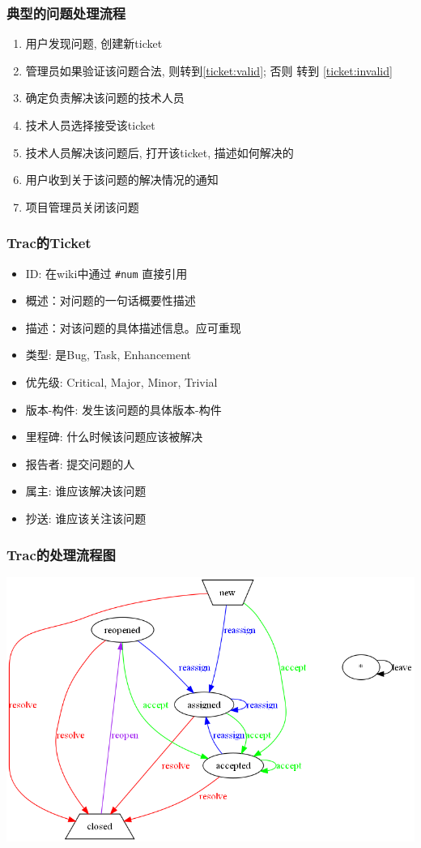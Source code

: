 \documentclass[compress]{beamer}
\begin{document}
\begin{frame}
    \frametitle{典型的问题处理流程}
    \begin{enumerate}
        \item 用户发现问题, 创建新ticket
        \item 管理员如果验证该问题合法,
            则转到\textcircled{\ref{ticket:valid}}; 否则 转到
            \textcircled{\ref{ticket:invalid}}
        \item \label{ticket:valid}确定负责解决该问题的技术人员
        \item 技术人员选择接受该ticket
        \item 技术人员解决该问题后, 打开该ticket, 描述如何解决的
        \item 用户收到关于该问题的解决情况的通知
        \item \label{ticket:invalid}项目管理员关闭该问题
    \end{enumerate}
\end{frame}

\begin{frame}[containsverbatim]
    \frametitle{Trac的Ticket}
    \begin{itemize}
        \item ID: 在wiki中通过 \verb~#num~ 直接引用
        \item 概述：对问题的一句话概要性描述
        \item 描述：对该问题的具体描述信息。应可重现
        \item 类型: 是Bug, Task, Enhancement
        \item 优先级: Critical, Major, Minor, Trivial
        \item 版本-构件: 发生该问题的具体版本-构件
        \item 里程碑: 什么时候该问题应该被解决
        \item 报告者: 提交问题的人
        \item 属主: 谁应该解决该问题
        \item 抄送: 谁应该关注该问题
    \end{itemize}
\end{frame}


\begin{frame}
    \frametitle{Trac的处理流程图}
\includegraphics[width=\hsize]{basic-workflow.png}
\end{frame}
\end{document}

